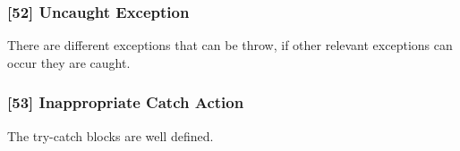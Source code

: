 \subsubsection{[52] Uncaught Exception}
There are different exceptions that can be throw, if other relevant exceptions can occur they are caught.

\subsubsection{[53] Inappropriate Catch Action}
The try-catch blocks are well defined.
